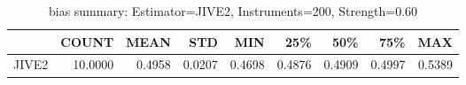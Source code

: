 \begin{table}[ht]
\centering
\caption{bias summary: Estimator=JIVE2, Instruments=200, Strength=0.60}
\begin{tabular}{lrrrrrrrr}
\toprule
 & COUNT & MEAN & STD & MIN & 25\% & 50\% & 75\% & MAX \\
\midrule
JIVE2 & 10.0000 & 0.4958 & 0.0207 & 0.4698 & 0.4876 & 0.4909 & 0.4997 & 0.5389 \\
\bottomrule
\end{tabular}
\end{table}
